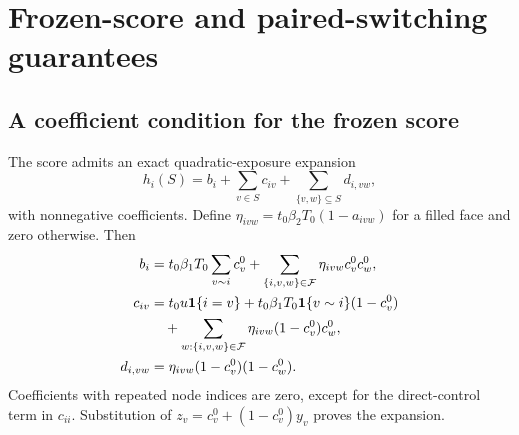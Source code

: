 \documentclass[preprint,11pt,sort&compress]{elsarticle}
\newcommand{\ind}{\mathbf{1}}
\newcommand{\Fset}{\mathcal{F}}
\begin{document}
\FloatBarrier\section{Frozen-score and paired-switching guarantees}\subsection{A coefficient condition for the frozen score}
\label{sec:scoreguarantee}
The score admits an exact quadratic-exposure expansion
\begin{equation}
 h_i(S)=b_i+\sum_{v\in S}c_{iv}
                +\sum_{\{v,w\}\subseteq S}d_{i,vw},\label{eq:quadratic}
\end{equation}
with nonnegative coefficients. Define $\eta_{ivw}=t_0\beta_2T_0(1-a_{ivw})$ for a filled face and zero otherwise. Then
\begin{align}
 b_i&=t_0\beta_1T_0\sum_{v\sim i}c_v^0
           +\sum_{\{i,v,w\}\in\Fset}\eta_{ivw}c_v^0c_w^0,\notag\\
 c_{iv}&=t_0u\ind\{i=v\}
    +t_0\beta_1T_0\ind\{v\sim i\}(1-c_v^0)\notag\\
 &\quad+\sum_{w:\{i,v,w\}\in\Fset}\eta_{ivw}(1-c_v^0)c_w^0,\notag\\
 d_{i,vw}&=\eta_{ivw}(1-c_v^0)(1-c_w^0).\label{eq:coefficients}
\end{align}
Coefficients with repeated node indices are zero, except for the direct-control term in $c_{ii}$. Substitution of $z_v=c_v^0+(1-c_v^0)y_v$ proves the expansion.
\end{document}
